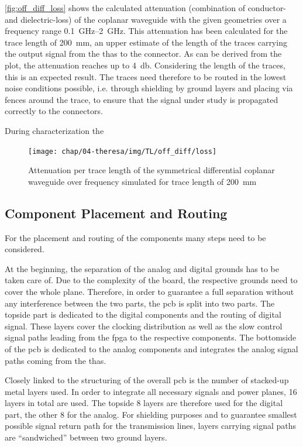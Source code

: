 \autoref{fig:off_diff_loss} shows the calculated attenuation (combination of conductor- and dielectric-loss) of the coplanar waveguide with the given geometries over a frequency range \SIrange{0.1}{2}{\GHz}. 
This attenuation has been calculated for the trace length of \SI{200}{\mm}, an upper estimate of the length of the traces carrying the output signal from the \glspl{tha} to the connector.
As can be derived from the plot, the attenuation reaches up to \SI{4}{\decibel}.
Considering the length of the traces, this is an expected result. 
The traces need therefore to be routed in the lowest noise conditions possible, i.e. through shielding by ground layers and placing via fences around the trace, to ensure that the signal under study is propagated correctly to the connectors.

During characterization the %


\begin{figure}[tb]
	\centering
	\texttt{[image: chap/04-theresa/img/TL/off\_diff/loss]}
	\caption[SCWG]{Attenuation per trace length of the symmetrical differential coplanar waveguide over frequency simulated for trace length of \SI{200}{\mm}}
	\label{fig:off_diff_loss}
\end{figure}

\clearpage
\subsection{Component Placement and Routing}
For the placement and routing of the components many steps need to be considered.

At the beginning, the separation of the analog and digital grounds has to be taken care of. 
Due to the complexity of the board, the respective grounds need to cover the whole plane. 
Therefore, in order to guarantee a full separation without any interference between the two parts, the \gls{pcb} is split into two parts.
The topside part is dedicated to the digital components and the routing of digital signal. 
These layers cover the clocking distribution as well as the slow control signal paths leading from the \gls{fpga} to the respective components.
The bottomside of the \gls{pcb} is dedicated to the analog components and integrates the analog signal paths coming from the \glspl{tha}.

Closely linked to the structuring of the overall \gls{pcb} is the number of stacked-up metal layers used.
In order to integrate all necessary signals and power planes, 16 layers in total are used.
The topside 8 layers are therefore used for the digital part, the other 8 for the analog.
For shielding purposes and to guarantee smallest possible signal return path for the transmission lines, layers carrying signal paths are ``sandwiched'' between two ground layers.

